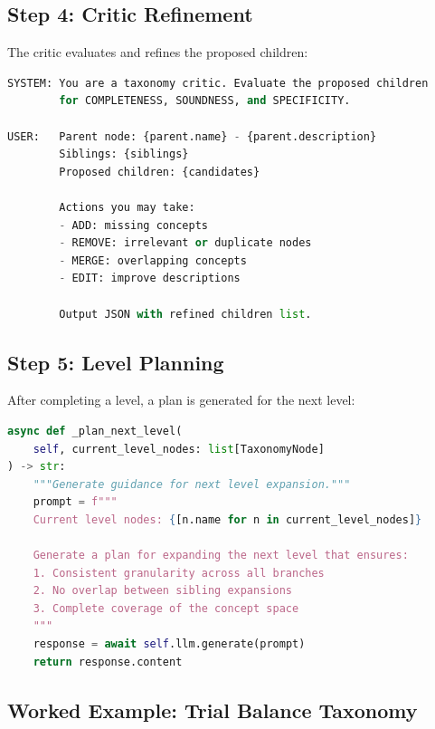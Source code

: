 \documentclass[11pt,a4paper]{article}
\begin{document}
\subsection{Step 4: Critic Refinement}

The critic evaluates and refines the proposed children:

\begin{lstlisting}[language=Python,caption={Critic refinement prompt}]
SYSTEM: You are a taxonomy critic. Evaluate the proposed children
        for COMPLETENESS, SOUNDNESS, and SPECIFICITY.
        
USER:   Parent node: {parent.name} - {parent.description}
        Siblings: {siblings}
        Proposed children: {candidates}
        
        Actions you may take:
        - ADD: missing concepts
        - REMOVE: irrelevant or duplicate nodes
        - MERGE: overlapping concepts
        - EDIT: improve descriptions
        
        Output JSON with refined children list.
\end{lstlisting}

\subsection{Step 5: Level Planning}

After completing a level, a plan is generated for the next level:

\begin{lstlisting}[language=Python,caption={Level planning}]
async def _plan_next_level(
    self, current_level_nodes: list[TaxonomyNode]
) -> str:
    """Generate guidance for next level expansion."""
    prompt = f"""
    Current level nodes: {[n.name for n in current_level_nodes]}
    
    Generate a plan for expanding the next level that ensures:
    1. Consistent granularity across all branches
    2. No overlap between sibling expansions
    3. Complete coverage of the concept space
    """
    response = await self.llm.generate(prompt)
    return response.content
\end{lstlisting}

\subsection{Worked Example: Trial Balance Taxonomy}
\end{document}
